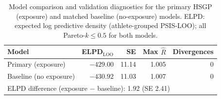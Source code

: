 \begin{table}[htbp]
\centering
\caption{Model comparison and validation diagnostics for the primary HSGP (exposure) and matched baseline (no-exposure) models. ELPD: expected log predictive density (athlete-grouped PSIS-LOO); all Pareto-$k \leq 0.5$ for both models.}
\label{tab:model-comparison}
\begin{tabular}{lrrrr}
\toprule
Model & ELPD$_{\text{LOO}}$ & SE & Max $\hat{R}$ & Divergences \\
\midrule
Primary (exposure) & $-429.00$ & 11.14 & 1.005 & 0 \\
Baseline (no exposure) & $-430.92$ & 11.03 & 1.007 & 0 \\
\midrule
\multicolumn{5}{l}{ELPD difference (exposure $-$ baseline): 1.92 (SE 2.41)} \\
\bottomrule
\end{tabular}
\end{table}
